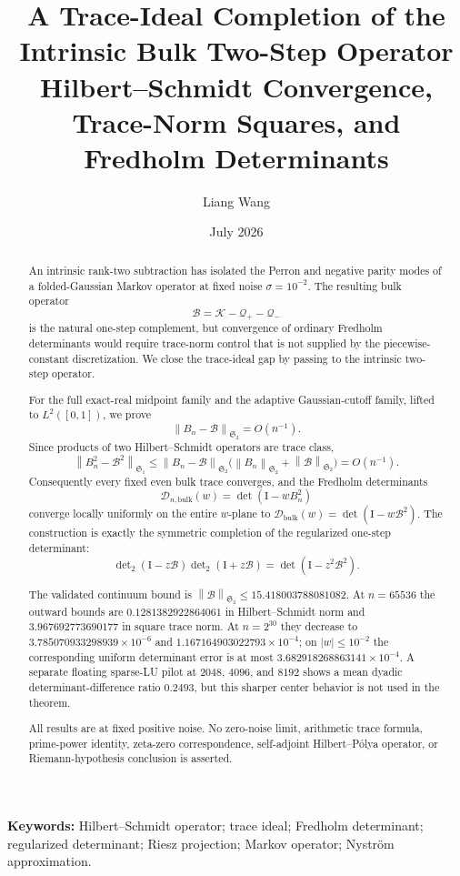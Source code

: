 \documentclass[11pt]{article}
\title{A Trace-Ideal Completion of the Intrinsic Bulk Two-Step Operator\\
\large Hilbert--Schmidt Convergence, Trace-Norm Squares, and Fredholm Determinants}
\author{Liang Wang}
\date{July 2026}
\theoremstyle{definition}
\theoremstyle{remark}
\newcommand{\Id}{\mathrm I}
\newcommand{\cK}{\mathcal K}
\newcommand{\cB}{\mathcal B}
\newcommand{\cQ}{\mathcal Q}
\newcommand{\cD}{\mathcal D}
\newcommand{\norm}[1]{\left\lVert #1\right\rVert}
\newcommand{\detF}{\operatorname{det}}
\newcommand{\Dettwo}{\operatorname{det}\nolimits_2}
\begin{document}
\maketitle

\begin{abstract}
An intrinsic rank-two subtraction has isolated the Perron and negative
parity modes of a folded-Gaussian Markov operator at fixed noise
$\sigma=10^{-2}$.  The resulting bulk operator
\[
 \cB=\cK-\cQ_+-\cQ_-
\]
is the natural one-step complement, but convergence of ordinary Fredholm
determinants would require trace-norm control that is not supplied by the
piecewise-constant discretization.  We close the trace-ideal gap by passing
to the intrinsic two-step operator.

For the full exact-real midpoint family and the adaptive Gaussian-cutoff
family, lifted to $L^2([0,1])$, we prove
\[
 \norm{B_n-\cB}_{\mathfrak S_2}=O(n^{-1}).
\]
Since products of two Hilbert--Schmidt operators are trace class,
\[
 \norm{B_n^2-\cB^2}_{\mathfrak S_1}
 \le \norm{B_n-\cB}_{\mathfrak S_2}
     \bigl(\norm{B_n}_{\mathfrak S_2}
           +\norm{\cB}_{\mathfrak S_2}\bigr)
 =O(n^{-1}).
\]
Consequently every fixed even bulk trace converges, and the Fredholm
determinants
\[
 \cD_{n,\mathrm{bulk}}(w)=\detF(\Id-wB_n^2)
\]
converge locally uniformly on the entire $w$-plane to
$\cD_{\mathrm{bulk}}(w)=\detF(\Id-w\cB^2)$.  The construction is exactly
the symmetric completion of the regularized one-step determinant:
\[
 \Dettwo(\Id-z\cB)\Dettwo(\Id+z\cB)
 =\detF(\Id-z^2\cB^2).
\]

The validated continuum bound is
$\norm{\cB}_{\mathfrak S_2}\le15.418003788081082$.  At $n=65536$ the
outward bounds are $0.1281382922864061$ in Hilbert--Schmidt norm and
$3.967692773690177$ in square trace norm.  At $n=2^{30}$ they decrease to
$3.785070933298939\times10^{-6}$ and
$1.167164903022793\times10^{-4}$; on $|w|\le10^{-2}$ the corresponding
uniform determinant error is at most
$3.682918268863141\times10^{-4}$.  A separate floating sparse-LU pilot at
$2048$, $4096$, and $8192$ shows a mean dyadic determinant-difference ratio
$0.2493$, but this sharper center behavior is not used in the theorem.

All results are at fixed positive noise.  No zero-noise limit, arithmetic
trace formula, prime-power identity, zeta-zero correspondence,
self-adjoint Hilbert--P\'olya operator, or Riemann-hypothesis conclusion is
asserted.
\end{abstract}

\noindent\textbf{Keywords:} Hilbert--Schmidt operator; trace ideal;
Fredholm determinant; regularized determinant; Riesz projection; Markov
operator; Nystr\"om approximation.
\end{document}
